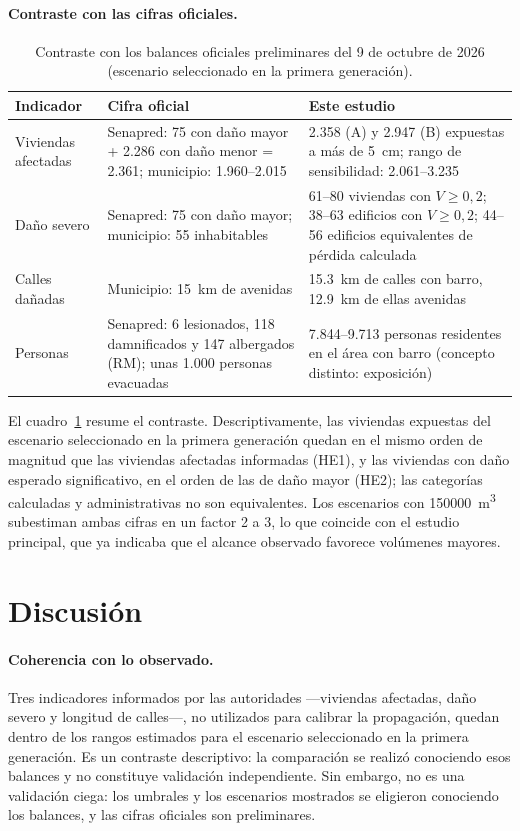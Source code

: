 \documentclass[10pt,a4paper]{article}
\begin{document}
\paragraph{Contraste con las cifras oficiales.}
\begin{table}[htbp]\centering\small
\caption{Contraste con los balances oficiales preliminares del 9 de octubre de 2026 (escenario seleccionado en la primera generación).}\label{tab:contraste}
\begin{tabular}{p{}p{}p{}}\toprule
Indicador & Cifra oficial & Este estudio\\\midrule
Viviendas afectadas & Senapred: 75 con daño mayor + 2.286 con daño menor = 2.361; municipio: 1.960--2.015 & 2.358 (A) y 2.947 (B) expuestas a más de \SI{5}{cm}; rango de sensibilidad: 2.061--3.235\\
Daño severo & Senapred: 75 con daño mayor; municipio: 55 inhabitables & 61--80 viviendas con $V\geq0{,}2$; 38--63 edificios con $V\geq0{,}2$; 44--56 edificios equivalentes de pérdida calculada\\
Calles dañadas & Municipio: \SI{15}{km} de avenidas & \SI{15,3}{km} de calles con barro, \SI{12,9}{km} de ellas avenidas\\
Personas & Senapred: 6 lesionados, 118 damnificados y 147 albergados (RM); unas 1.000 personas evacuadas & 7.844--9.713 personas residentes en el área con barro (concepto distinto: exposición)\\
\bottomrule\end{tabular}\end{table}
El cuadro~\ref{tab:contraste} resume el contraste. Descriptivamente, las viviendas expuestas del escenario seleccionado en la primera generación quedan en el mismo orden de magnitud que las viviendas afectadas informadas (HE1), y las viviendas con daño esperado significativo, en el orden de las de daño mayor (HE2); las categorías calculadas y administrativas no son equivalentes. Los escenarios con \SI{150000}{m^3} subestiman ambas cifras en un factor 2 a 3, lo que coincide con el estudio principal, que ya indicaba que el alcance observado favorece volúmenes mayores.

\section{Discusión}
\paragraph{Coherencia con lo observado.} Tres indicadores informados por las autoridades ---viviendas afectadas, daño severo y longitud de calles---, no utilizados para calibrar la propagación, quedan dentro de los rangos estimados para el escenario seleccionado en la primera generación. Es un contraste descriptivo: la comparación se realizó conociendo esos balances y no constituye validación independiente. Sin embargo, no es una validación ciega: los umbrales y los escenarios mostrados se eligieron conociendo los balances, y las cifras oficiales son preliminares.
\end{document}
